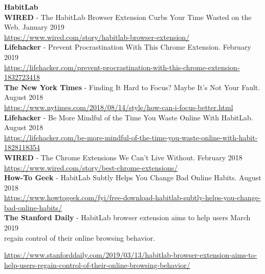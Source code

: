 
\textcolor{sectcol}{\textbf{HabitLab}}\\

\textbf{WIRED} - The HabitLab Browser Extension Curbs Your Time Wasted on the Web. \hfill January 2019\\
\url{https://www.wired.com/story/habitlab-browser-extension/}\\

\textbf{Lifehacker} - Prevent Procrastination With This Chrome Extension. \hfill February 2019\\
\url{https://lifehacker.com/prevent-procrastination-with-this-chrome-extension-1832723418}\\

\textbf{The New York Times} - Finding It Hard to Focus? Maybe It’s Not Your Fault. \hfill August 2018\\
\url{https://www.nytimes.com/2018/08/14/style/how-can-i-focus-better.html}\\


\textbf{Lifehacker} - Be More Mindful of the Time You Waste Online With HabitLab. \hfill August 2018\\
\url{https://lifehacker.com/be-more-mindful-of-the-time-you-waste-online-with-habit-1828118354}\\

\textbf{WIRED} - The Chrome Extensions We Can't Live Without. \hfill February 2018\\
\url{https://www.wired.com/story/best-chrome-extensions/}\\

\textbf{How-To Geek} - HabitLab Subtly Helps You Change Bad Online Habits. \hfill August 2018\\
\url{https://www.howtogeek.com/fyi/free-download-habitlab-subtly-helps-you-change-bad-online-habits/}\\

\textbf{The Stanford Daily} - HabitLab browser extension aims to help users \hfill March 2019\\
regain control of their online browsing behavior.\\
\begin{footnotesize}
\url{https://www.stanforddaily.com/2019/03/13/habitlab-browser-extension-aims-to-help-users-regain-control-of-their-online-browsing-behavior/}
\end{footnotesize}\\

